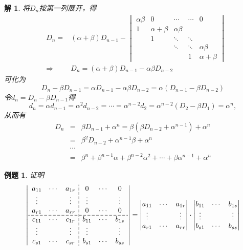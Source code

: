 \documentclass[a4paper]{book}
\newtheorem{eg}{例题}[chapter]
\newtheorem*{solution}{解}
\begin{document}
\begin{solution}
将$D_n$按第一列展开，得
\begin{eqnarray*}
& D_n = & (\alpha + \beta) D_{n-1} - \begin{vmatrix}
\alpha\beta & 0 & \cdots & \cdots & 0 \\ 1 & \alpha + \beta & \alpha\beta & & \\ & 1 & \ddots & \ddots & \\ & & \ddots & \ddots & \alpha\beta \\ & & & 1 & \alpha + \beta
\end{vmatrix} \\
& \Longrightarrow & D_n = (\alpha + \beta) D_{n-1} - \alpha\beta D_{n-2}
\end{eqnarray*}
可化为
$$D_n - \beta D_{n-1}= \alpha D_{n-1} - \alpha\beta D_{n-2} = \alpha(D_{n-1} - \beta D_{n-2})$$
令$d_n = D_n - \beta D_{n-1}$得
$$d_n = \alpha d_{n-1} = \alpha^2 d_{n-2} = \cdots = \alpha^{n-2} d_2 = \alpha^{n-2}(D_2 - \beta D_1) = \alpha^n,$$
从而有
\begin{eqnarray*}
D_n & = & \beta D_{n-1} + \alpha^n = \beta (\beta D_{n-2} + \alpha^{n-1}) + \alpha^n \\
& = & \beta^2 D_{n-2} + \alpha^{n-1}\beta + \alpha^n \\
& \cdots & \\
& = & \beta^n + \beta^{n-1}\alpha + \beta^{n-2}\alpha^2 + \cdots + \beta\alpha^{n-1} + \alpha^n
\end{eqnarray*}
\end{solution}

\begin{eg} \label{eg:block_matrix}
证明
\[
  \setlength{\dashlinegap}{2pt}
  \left| \begin{array}{ccc:ccc}
    a_{11} & \cdots & a_{1r} & 0 & \cdots & 0 \\
    \vdots & & \vdots & \vdots & & \vdots \\
    a_{r1} & \cdots & a_{rr} & 0 & \cdots & 0 \\
    \hdashline
    c_{11} & \cdots & c_{1r} & b_{11} & \cdots & b_{1s} \\
    \vdots & & \vdots & \vdots & & \vdots \\
    c_{s1} & \cdots & c_{sr} & b_{s1} & \cdots & b_{ss} \\
  \end{array} \right| =
\begin{vmatrix}
a_{11} & \cdots & a_{1r} \\
\vdots & & \vdots \\
a_{r1} & \cdots & a_{rr}
\end{vmatrix} \cdot
\begin{vmatrix}
b_{11} & \cdots & b_{1s} \\
\vdots & & \vdots \\
b_{s1} & \cdots & b_{ss}
\end{vmatrix}
\]
\end{eg}
\end{document}
